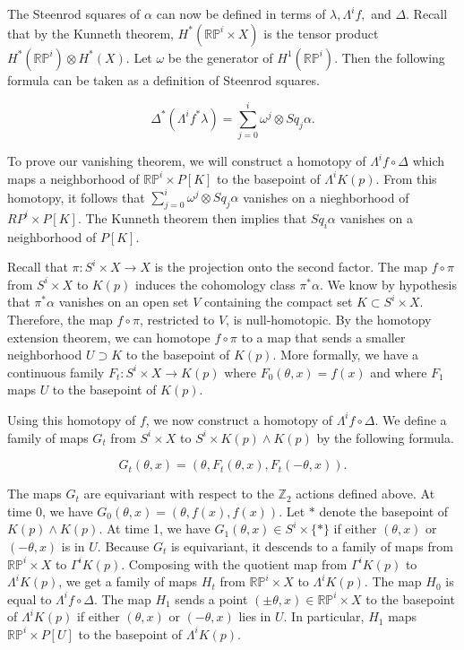 \documentclass{amsart}
\newtheorem*{Theorem 1}{Theorem 1}
\newtheorem*{Theorem 2}{Theorem 2}
\newtheorem*{Theorem 1A}{Theorem 1A}
\newtheorem*{Theorem 2A}{Theorem 2A}
\newtheorem*{vanishing lemma}{Vanishing Lemma}
\numberwithin{equation}{section}
\begin{document}
The Steenrod squares of $\alpha$ can now be defined in terms of
$\lambda,
\Lambda^i f,$ and $\Delta$.  Recall that by the Kunneth theorem,
$H^*(\mathbb{RP}^i \times X)$ is the tensor product
$H^*(\mathbb{RP}^i) \otimes H^*(X)$.  Let $\omega$ be the
generator of $H^1(\mathbb{RP}^i)$.  Then the following formula
can be taken as a definition of Steenrod squares.

$$\Delta^* (\Lambda^i f^* \lambda) = \sum_{j=0}^i \omega^j
\otimes Sq_j \alpha.$$

To prove our vanishing theorem, we will construct a homotopy of
$\Lambda^i f \circ \Delta$ which maps a neighborhood of
$\mathbb{RP}^i \times P[K]$ to the basepoint of
$\Lambda^i K(p)$.  From this homotopy, it follows that
$\sum_{j=0}^i \omega^j \otimes Sq_j \alpha$ vanishes on
a nieghborhood of $RP^i \times P[K]$.  The Kunneth
theorem then implies that $Sq_i \alpha$ vanishes on a
neighborhood of $P[K]$.

Recall that $\pi: S^i \times X \rightarrow X$ is the projection
onto the second factor.  The map $f \circ \pi$ from 
$S^i \times X$ to $K(p)$ induces the
cohomology class $\pi^* \alpha$.  We know by hypothesis that
$\pi^* \alpha$ vanishes on an open set $V$ containing the compact
set $K \subset
S^i \times X$. Therefore, the map $f \circ \pi$, restricted to
$V$, is null-homotopic.  By the homotopy extension
theorem, we can homotope $f \circ \pi$ to a map that sends a
smaller neighborhood $U \supset K$ to the basepoint of $K(p)$.  More
formally, we have a continuous family $F_t: S^i
\times X \rightarrow K(p)$ where $F_0(\theta, x) =
f(x)$ and where $F_1$ maps $U$ to the
basepoint of $K(p)$.

Using this homotopy of $f$, we now construct a homotopy of
$\Lambda^i f \circ \Delta$.  We define a family of maps $G_t$
from $S^i \times X$ to $S^i \times K(p) \wedge K(p)$ by the
following formula.

$$G_t(\theta, x) = (\theta, F_t(\theta, x), F_t(- \theta, x)).$$

The maps $G_t$ are equivariant with respect to the $\mathbb{Z}_2$
actions defined above.  At time 0, we have $G_0(\theta, x) =
(\theta, f(x), f(x))$.  Let $*$ denote the basepoint of $K(p)
\wedge K(p)$.  At time 1, we have $G_1(\theta, x) \in
S^i \times \{*\}$ if either $(\theta, x)$ or $(- \theta, x)$ is
in $U$.  Because $G_t$ is equivariant, it descends to a family of
maps from $\mathbb{RP}^i \times X$ to $\Gamma^i K(p)$.  Composing
with the quotient map from $\Gamma^i K(p)$ to $\Lambda^i K(p)$,
we get a family of maps $H_t$ from $\mathbb{RP}^i \times X$ to
$\Lambda^i K(p)$.  The map
$H_0$ is equal to $\Lambda^i f \circ \Delta$.  The map $H_1$
sends a point $(\pm \theta, x) \in \mathbb{RP}^i
\times X$ to the basepoint of $\Lambda^i K(p)$ if either $(\theta,
x)$ or $(- \theta, x)$ lies in $U$.  In particular,
$H_1$ maps $\mathbb{RP}^i \times P[U]$ to the basepoint of
$\Lambda^i K(p)$.
\end{document}
